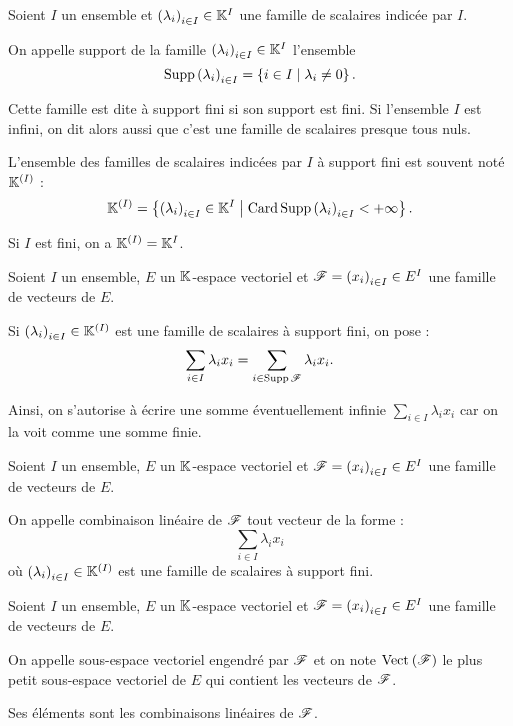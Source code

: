 \begin{defi}
Soient \(I\) un ensemble et \(\left(\lambda_i\right)_{i\in I}\in\mathbb{K}^I\) une famille de scalaires indicée par \(I\).

On appelle support de la famille \(\left(\lambda_i\right)_{i\in I}\in\mathbb{K}^I\) l'ensemble \[\operatorname{Supp}\left(\lambda_i\right)_{i\in I}=\left\lbrace i\in I\;\middle|\;\lambda_i\not=0\right\rbrace.\]

Cette famille est dite à support fini si son support est fini. Si l'ensemble \(I\) est infini, on dit alors aussi que c'est une famille de scalaires presque tous nuls.

L'ensemble des familles de scalaires indicées par \(I\) à support fini est souvent noté \(\mathbb{K}^{\left(I\right)}\) : \[\mathbb{K}^{\left(I\right)}=\left\lbrace\left(\lambda_i\right)_{i\in I}\in\mathbb{K}^I\;\middle|\;\operatorname{Card}\operatorname{Supp}\left(\lambda_i\right)_{i\in I}<+\infty\right\rbrace.\]

Si \(I\) est fini, on a \(\mathbb{K}^{\left(I\right)}=\mathbb{K}^I\).
\end{defi}

\begin{nota}
Soient \(I\) un ensemble, \(E\) un \(\mathbb{K}\)-espace vectoriel et \(\mathscr{F}=\left(x_i\right)_{i\in I}\in E^I\) une famille de vecteurs de \(E\).

Si \(\left(\lambda_i\right)_{i\in I}\in\mathbb{K}^{\left(I\right)}\) est une famille de scalaires à support fini, on pose : \[\sum_{i\in I}\lambda_ix_i=\sum_{i\in\operatorname{Supp}\mathscr{F}}\lambda_ix_i.\]

Ainsi, on s'autorise à écrire une somme éventuellement infinie \(\sum_{i\in I}\lambda_ix_i\) car on la voit comme une somme finie.
\end{nota}

\begin{defi}
Soient \(I\) un ensemble, \(E\) un \(\mathbb{K}\)-espace vectoriel et \(\mathscr{F}=\left(x_i\right)_{i\in I}\in E^I\) une famille de vecteurs de \(E\).

On appelle combinaison linéaire de \(\mathscr{F}\) tout vecteur de la forme : \[\sum_{i\in I}\lambda_ix_i\] où \(\left(\lambda_i\right)_{i\in I}\in\mathbb{K}^{\left(I\right)}\) est une famille de scalaires à support fini.
\end{defi}

\begin{defprop}
Soient \(I\) un ensemble, \(E\) un \(\mathbb{K}\)-espace vectoriel et \(\mathscr{F}=\left(x_i\right)_{i\in I}\in E^I\) une famille de vecteurs de \(E\).

On appelle sous-espace vectoriel engendré par \(\mathscr{F}\) et on note \(\Vect{\fami{F}}\) le plus petit sous-espace vectoriel de \(E\) qui contient les vecteurs de \(\mathscr{F}\).

Ses éléments sont les combinaisons linéaires de \(\mathscr{F}\).
\end{defprop}


